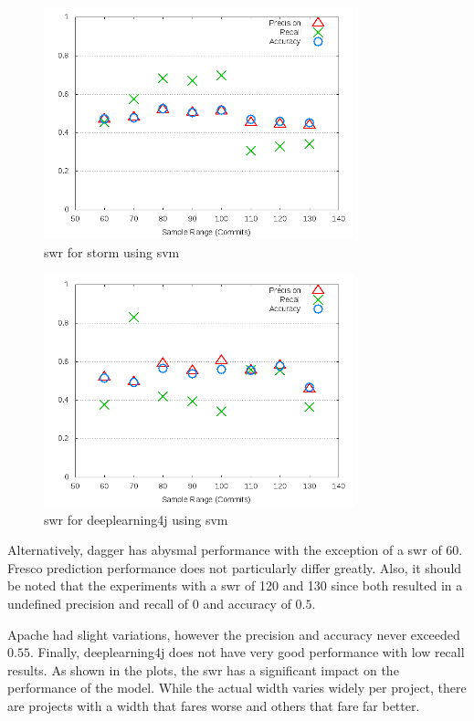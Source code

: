 \begin{figure}[!ht]
    \centering
        \includegraphics[width=0.8\textwidth]{images/svm/test_1/storm_sample_range}
        \caption{\gls{swr} for storm using \gls{svm}}
        \label{fig:test_1_storm_svm}
\end{figure}

\begin{figure}[h]
    \centering
        \includegraphics[width=0.8\textwidth]{images/svm/test_1/deeplearning4j_sample_range}
    \caption{\gls{swr} for deeplearning4j using \gls{svm}}
    \label{fig:test_1_deeplearning4j_svm}
\end{figure}

Alternatively, dagger has abysmal performance with the exception of a \gls{swr} of 60. Fresco prediction performance does not particularly differ greatly. Also, it should be noted that the experiments with a \gls{swr} of 120 and 130 since both resulted in a undefined precision and recall of 0 and accuracy of $0.5$.

Apache had slight variations, however the precision and accuracy never exceeded $0.55$. Finally, deeplearning4j does not have very good performance with low recall results. As shown in the plots, the \gls{swr} has a significant impact on the performance of the model. While the actual width varies widely per project, there are projects with a width that fares worse and others that fare far better.

